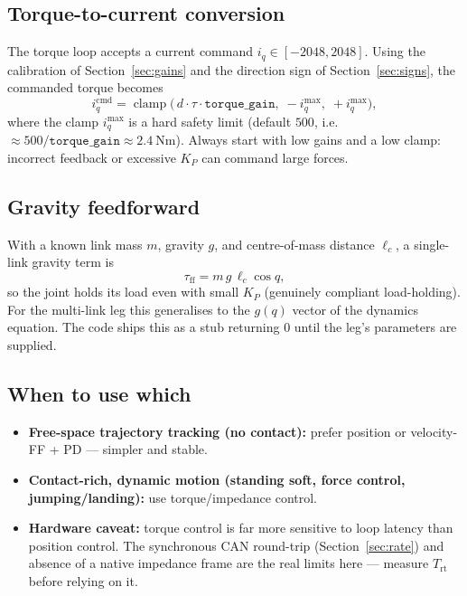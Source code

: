 \documentclass[11pt,a4paper]{article}
\begin{document}
\subsection{Torque-to-current conversion}
The torque loop accepts a current command $i_q\in[-2048,2048]$. Using the
calibration of Section~\ref{sec:gains} and the direction sign of
Section~\ref{sec:signs}, the commanded torque becomes
\begin{equation}
  i_q^{\text{cmd}} = \operatorname{clamp}\!\big(\,d\cdot\tau\cdot\texttt{torque\_gain},\;
  -i_q^{\max},\; +i_q^{\max}\big),
\end{equation}
where the clamp $i_q^{\max}$ is a hard safety limit (default $500$, i.e.\
$\approx 500/\texttt{torque\_gain}\approx\SI{2.4}{\newton\meter}$). Always start
with low gains and a low clamp: incorrect feedback or excessive $K_P$ can command
large forces.

\subsection{Gravity feedforward}
With a known link mass $m$, gravity $g$, and centre-of-mass distance $\ell_c$, a
single-link gravity term is
\begin{equation}
  \tau_{\text{ff}} = m\,g\,\ell_c\cos q,
\end{equation}
so the joint holds its load even with small $K_P$ (genuinely compliant
load-holding). For the multi-link leg this generalises to the $g(q)$ vector of
the dynamics equation. The code ships this as a stub returning $0$ until the
leg's parameters are supplied.

\subsection{When to use which}
\begin{itemize}[nosep]
  \item \textbf{Free-space trajectory tracking (no contact):} prefer position or
        velocity-FF + PD --- simpler and stable.
  \item \textbf{Contact-rich, dynamic motion (standing soft, force control,
        jumping/landing):} use torque/impedance control.
  \item \textbf{Hardware caveat:} torque control is far more sensitive to loop
        latency than position control. The synchronous CAN round-trip
        (Section~\ref{sec:rate}) and absence of a native impedance frame are the
        real limits here --- measure $T_{\text{rt}}$ before relying on it.
\end{itemize}
\end{document}
